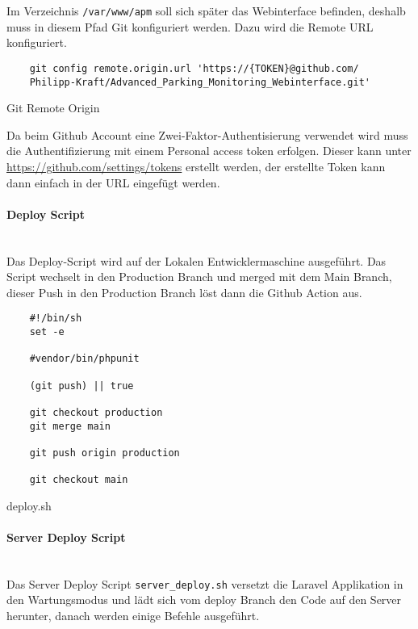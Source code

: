 Im Verzeichnis \verb|/var/www/apm| soll sich später das Webinterface befinden,
deshalb muss in diesem Pfad Git konfiguriert werden. Dazu wird die Remote URL
konfiguriert.

\begin{listing}[H]
  \begin{verbatim}
    git config remote.origin.url 'https://{TOKEN}@github.com/
    Philipp-Kraft/Advanced_Parking_Monitoring_Webinterface.git'
  \end{verbatim}
  \caption{Git Remote Origin}
\end{listing}

Da beim Github Account eine Zwei-Faktor-Authentisierung verwendet wird muss die
Authentifizierung mit einem Personal access token erfolgen. Dieser kann unter
\url{https://github.com/settings/tokens} erstellt werden, der erstellte Token
kann dann einfach in der URL eingefügt werden.

\paragraph{Deploy Script}\mbox{}\\

Das Deploy-Script wird auf der Lokalen Entwicklermaschine ausgeführt. Das Script
wechselt in den Production Branch und merged mit dem Main Branch, dieser Push in
den Production Branch löst dann die Github Action aus.

\begin{listing}[H]
  \begin{verbatim}
    #!/bin/sh
    set -e
    
    #vendor/bin/phpunit
    
    (git push) || true
    
    git checkout production
    git merge main
    
    git push origin production
    
    git checkout main
  \end{verbatim}
  \caption{deploy.sh}
\end{listing}

\paragraph{Server Deploy Script}\mbox{}\\

Das Server Deploy Script \verb|server_deploy.sh| versetzt die Laravel
Applikation in den Wartungsmodus und lädt sich vom deploy Branch den Code auf
den Server herunter, danach werden einige Befehle ausgeführt.

